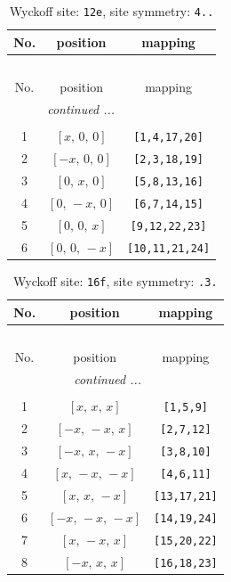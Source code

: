 \documentclass[fleqn,8pt]{jsarticle}
\begin{document}
\renewcommand{\arraystretch}{1.2}
\begin{longtable}{ccc}
\caption{Wyckoff site: {\tt 12e}, site symmetry: {\tt 4..}}
 \\
 \hline \hline
No. & position & mapping \\ \hline \endfirsthead

\multicolumn{2}{l}{\tablename\ \thetable{}} \\
 \hline \hline
No. & position & mapping \\ \hline \endhead

 \hline \hline
\multicolumn{2}{r}{\footnotesize\it continued ...} \\ \endfoot

 \hline \hline
\multicolumn{2}{r}{} \\ \endlastfoot

1 & $\left[ x,\, 0,\, 0 \right]$ & {\tt [1,4,17,20]} \\ \hline
2 & $\left[ - x,\, 0,\, 0 \right]$ & {\tt [2,3,18,19]} \\ \hline
3 & $\left[ 0,\, x,\, 0 \right]$ & {\tt [5,8,13,16]} \\ \hline
4 & $\left[ 0,\, - x,\, 0 \right]$ & {\tt [6,7,14,15]} \\ \hline
5 & $\left[ 0,\, 0,\, x \right]$ & {\tt [9,12,22,23]} \\ \hline
6 & $\left[ 0,\, 0,\, - x \right]$ & {\tt [10,11,21,24]} \\
\end{longtable}
\renewcommand{\arraystretch}{1.2}
\begin{longtable}{ccc}
\caption{Wyckoff site: {\tt 16f}, site symmetry: {\tt .3.}}
 \\
 \hline \hline
No. & position & mapping \\ \hline \endfirsthead

\multicolumn{2}{l}{\tablename\ \thetable{}} \\
 \hline \hline
No. & position & mapping \\ \hline \endhead

 \hline \hline
\multicolumn{2}{r}{\footnotesize\it continued ...} \\ \endfoot

 \hline \hline
\multicolumn{2}{r}{} \\ \endlastfoot

1 & $\left[ x,\, x,\, x \right]$ & {\tt [1,5,9]} \\ \hline
2 & $\left[ - x,\, - x,\, x \right]$ & {\tt [2,7,12]} \\ \hline
3 & $\left[ - x,\, x,\, - x \right]$ & {\tt [3,8,10]} \\ \hline
4 & $\left[ x,\, - x,\, - x \right]$ & {\tt [4,6,11]} \\ \hline
5 & $\left[ x,\, x,\, - x \right]$ & {\tt [13,17,21]} \\ \hline
6 & $\left[ - x,\, - x,\, - x \right]$ & {\tt [14,19,24]} \\ \hline
7 & $\left[ x,\, - x,\, x \right]$ & {\tt [15,20,22]} \\ \hline
8 & $\left[ - x,\, x,\, x \right]$ & {\tt [16,18,23]} \\
\end{longtable}
\end{document}
